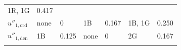 \begin{longtable}[]{@{}lllllll@{}}
\begin{minipage}[t]{0.07\columnwidth}
1R, 1G\strut
\end{minipage} & \begin{minipage}[t]{0.15\columnwidth}\raggedright
0.417\strut
\end{minipage}\tabularnewline
\begin{minipage}[t]{0.13\columnwidth}\raggedright
\(u''_{1,\text{ord}}\)\strut
\end{minipage} & \begin{minipage}[t]{0.10\columnwidth}\raggedright
none\strut
\end{minipage} & \begin{minipage}[t]{0.15\columnwidth}\raggedright
0\strut
\end{minipage} & \begin{minipage}[t]{0.06\columnwidth}\raggedright
1B\strut
\end{minipage} & \begin{minipage}[t]{0.15\columnwidth}\raggedright
0.167\strut
\end{minipage} & \begin{minipage}[t]{0.07\columnwidth}\raggedright
1B, 1G\strut
\end{minipage} & \begin{minipage}[t]{0.15\columnwidth}\raggedright
0.250\strut
\end{minipage}\tabularnewline
\begin{minipage}[t]{0.13\columnwidth}\raggedright
\(u''_{1,\text{den}}\)\strut
\end{minipage} & \begin{minipage}[t]{0.10\columnwidth}\raggedright
1B\strut
\end{minipage} & \begin{minipage}[t]{0.15\columnwidth}\raggedright
0.125\strut
\end{minipage} & \begin{minipage}[t]{0.06\columnwidth}\raggedright
none\strut
\end{minipage} & \begin{minipage}[t]{0.15\columnwidth}\raggedright
0\strut
\end{minipage} & \begin{minipage}[t]{0.07\columnwidth}\raggedright
2G\strut
\end{minipage} & \begin{minipage}[t]{0.15\columnwidth}\raggedright
0.167\strut
\end{minipage}\tabularnewline
\begin{minipage}[t]{0.13\columnwidth}\raggedright

\end{minipage}
\end{longtable}
